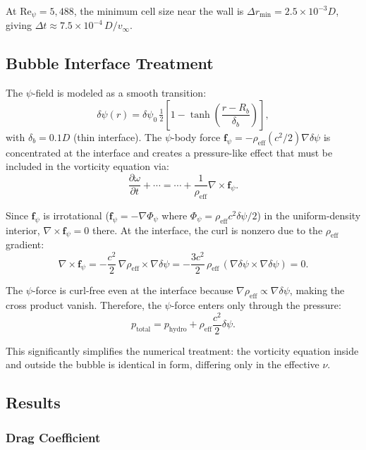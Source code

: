 \documentclass[12pt,twocolumn]{article}
\newcommand{\Reff}{\mathrm{eff}}
\newcommand{\Rey}{\mathrm{Re}}
\newcommand{\fvec}{\mathbf{f}}
\newcommand{\dpsi}{\delta\psi}
\newcommand{\half}{\tfrac{1}{2}}
\begin{document}
At $\Rey_\psi = 5{,}488$, the minimum cell size near the wall is
$\Delta r_\mathrm{min} = 2.5\times10^{-3}D$, giving $\Delta t \approx
7.5\times10^{-4}\,D/v_\infty$.

\subsection{Bubble Interface Treatment}

The $\psi$-field is modeled as a smooth transition:
\begin{equation}
\dpsi(r) = \dpsi_0\,\half\!\left[1 - \tanh\!\left(\frac{r - R_b}
{\delta_b}\right)\right],
\end{equation}
with $\delta_b = 0.1D$ (thin interface). The $\psi$-body force
$\fvec_\psi = -\rho_\Reff(c^2/2)\nabla\dpsi$ is concentrated at the
interface and creates a pressure-like effect that must be included in
the vorticity equation via:
\begin{equation}
\frac{\partial\omega}{\partial t} + \cdots = \cdots
+ \frac{1}{\rho_\Reff}\nabla\times\fvec_\psi.
\end{equation}

Since $\fvec_\psi$ is irrotational ($\fvec_\psi = -\nabla\Phi_\psi$
where $\Phi_\psi = \rho_\Reff c^2\dpsi/2$) in the uniform-density
interior, $\nabla\times\fvec_\psi = 0$ there. At the interface, the
curl is nonzero due to the $\rho_\Reff$ gradient:
\begin{equation}
\nabla\times\fvec_\psi = -\frac{c^2}{2}\,
\nabla\rho_\Reff\times\nabla\dpsi
= -\frac{3c^2}{2}\,\rho_\Reff\,(\nabla\dpsi\times\nabla\dpsi) = 0.
\end{equation}

The $\psi$-force is curl-free even at the interface because $\nabla\rho_\Reff
\propto \nabla\dpsi$, making the cross product vanish. Therefore, the
$\psi$-force enters only through the pressure:
\begin{equation}
p_\mathrm{total} = p_\mathrm{hydro} + \rho_\Reff\frac{c^2}{2}\dpsi.
\end{equation}

This significantly simplifies the numerical treatment: the vorticity equation
inside and outside the bubble is identical in form, differing only in the
effective $\nu$.

\subsection{Results}

\subsubsection{Drag Coefficient}
\end{document}
